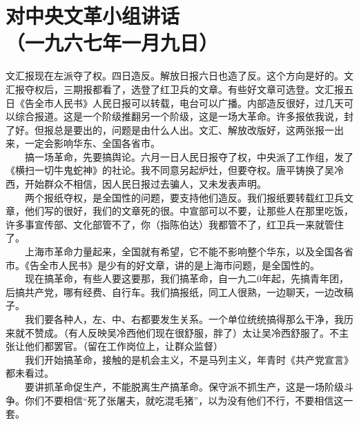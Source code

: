 \documentclass[cn,11pt,chinese]{elegantbook}
\def\myformat#1{\hfil\hfil #1}
\begin{document}
\section*{\myformat{对中央文革小组讲话}\\\myformat{（一九六七年一月九日）}}
文汇报现在左派夺了权。四日造反。解放日报六日也造了反。这个方向是好的。文汇报夺权后，三期报都看了，选登了红卫兵的文章。有些好文章可选登。文汇报五日《告全市人民书》人民日报可以转载，电台可以广播。内部造反很好，过几天可以综合报道。这是一个阶级推翻另一个阶级，这是一场大革命。许多报依我说，封了好。但报总是要出的，问题是由什么人出。文汇、解放改版好，这两张报一出来，一定会影响华东、全国各省市。\\
　　搞一场革命，先要搞舆论。六月一日人民日报夺了权，中央派了工作组，发了《横扫一切牛鬼蛇神》的社论。我不同意另起炉灶，但要夺权。唐平铸换了吴冷西，开始群众不相信，因人民日报过去骗人，又未发表声明。\\
　　两个报纸夺权，是全国性的问题，要支持他们造反。我们报纸要转载红卫兵文章，他们写的很好，我们的文章死的很。中宣部可以不要，让那些人在那里吃饭，许多事宣传部、文化部管不了，你（指陈伯达）我都管不了，红卫兵一来就管住了。\\
　　上海市革命力量起来，全国就有希望，它不能不影响整个华东，以及全国各省市。《告全市人民书》是少有的好文章，讲的是上海市问题，是全国性的。\\
　　现在搞革命，有些人要这要那，我们搞革命，自一九二0年起，先搞青年团，后搞共产党，哪有经费、自行车。我们搞报纸，同工人很熟，一边聊天，一边改稿子。\\
　　我们要各种人，左、中、右都要发生关系。一个单位统统搞得那么干净，我历来就不赞成。（有人反映吴冷西他们现在很舒服，胖了）太让吴冷西舒服了。不主张让他们都罢官。（留在工作岗位上，让群众监督）\\
　　我们开始搞革命，接触的是机会主义，不是马列主义，年青时《共产党宣言》都未看过。\\
　　要讲抓革命促生产，不能脱离生产搞革命。保守派不抓生产，这是一场阶级斗争。你们不要相信“死了张屠夫，就吃混毛猪”，以为没有他们不行，不要相信这一套。

\newpage
\end{document}
